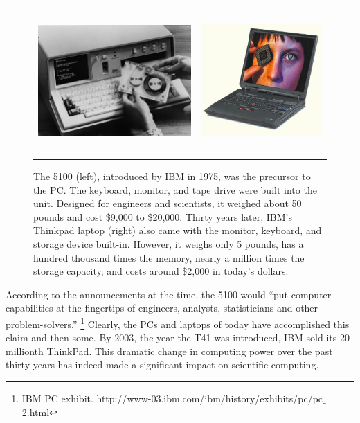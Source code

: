 \begin{figure}
\begin{center}
\begin{tabular}{cc}
\includegraphics[width=3in]{computerIntro/images/ibm5100.jpg}
&
\includegraphics[height=2.2in]{computerIntro/images/ibmThinkpad.jpg}
\end{tabular}
\caption{The 5100 (left), introduced by IBM in 1975, was the precursor
  to the PC.  The keyboard, monitor, and tape drive were built into
  the unit.  Designed for engineers and scientists, it weighed about
  50 pounds and cost \$9,000 to \$20,000.  Thirty years later, IBM's
  Thinkpad laptop (right) also came with the monitor, keyboard, and
  storage device built-in.  However, it weighs only 5 pounds, has a
  hundred thousand times the memory, nearly a million times the
  storage capacity, and costs around \$2,000 in today's dollars.}
\label{fig:5100Thinkpad}
\end{center}
\end{figure}

According to the announcements at the time, the 5100 would ``put
computer capabilities at the fingertips of engineers, analysts,
statisticians and other problem-solvers.'' \footnote{IBM PC exhibit.
  http://www-03.ibm.com/ibm/history/exhibits/pc/pc$\_$2.html} Clearly,
the PCs and laptops of today have accomplished this claim and then
some.  By 2003, the year the T41 was introduced, IBM sold its 20
millionth ThinkPad. This dramatic change in computing power over the
past thirty years has indeed made a significant impact on scientific
computing. 


